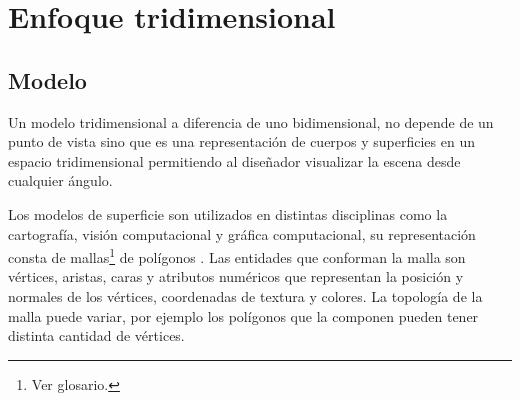 \section{Enfoque tridimensional}
\subsection{Modelo}
Un modelo tridimensional a diferencia de uno bidimensional, no depende de un punto de vista sino que es una representación de cuerpos y superficies en un espacio tridimensional permitiendo al diseñador visualizar la escena desde cualquier ángulo.

Los modelos de superficie son utilizados en distintas disciplinas como la cartografía, visión computacional y gráfica computacional, su representación consta de mallas\footnote{Ver glosario.} de polígonos \cite{Mesh_building}.
Las entidades que conforman la malla son vértices, aristas, caras y atributos numéricos que representan la posición y normales de los vértices, coordenadas de textura y colores. La topología de la malla puede variar, por ejemplo los polígonos que la componen pueden tener distinta cantidad de vértices.

